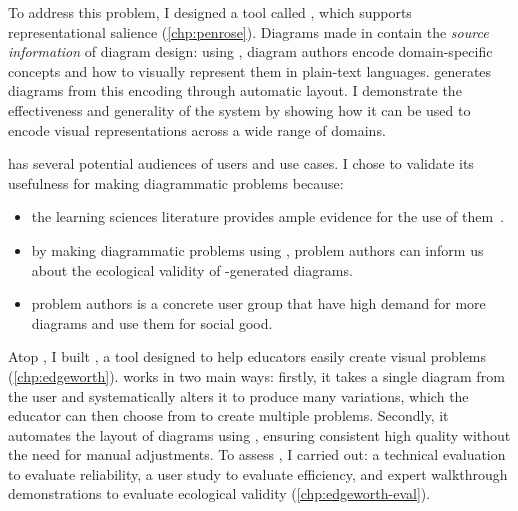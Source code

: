 To address this problem, I designed a tool called \Penrose, which supports representational salience (\cref{chp:penrose}). Diagrams made in \Penrose contain the \emph{source information} of diagram design: using \Penrose, diagram authors encode domain-specific concepts and how to visually represent them in plain-text languages. \Penrose generates diagrams from this encoding through automatic layout. I demonstrate the effectiveness and generality of the system by showing how it can be used to encode visual representations across a wide range of domains.

\Penrose has several potential audiences of users and use cases. I chose to validate its usefulness for making diagrammatic problems because:

\begin{itemize}
    \item the learning sciences literature provides ample evidence for the use of them~\cite{multipleReps, mayer_multimedia_2002, blum_combining_1998}.
    \item by making diagrammatic problems using \Penrose, problem authors can inform us about the ecological validity of \Penrose-generated diagrams.
    \item problem authors is a concrete user group that have high demand for more diagrams and use them for social good.
\end{itemize}

Atop \Penrose, I built \Edgeworth, a tool designed to help educators easily create visual problems (\cref{chp:edgeworth}). \Edgeworth works in two main ways: firstly, it takes a single diagram from the user and systematically alters it to produce many variations, which the educator can then choose from to create multiple problems. Secondly, it automates the layout of diagrams using \Penrose, ensuring consistent high quality without the need for manual adjustments. To assess \Edgeworth, I carried out: a technical evaluation to evaluate reliability, a user study to evaluate efficiency, and expert walkthrough demonstrations to evaluate ecological validity (\cref{chp:edgeworth-eval}). 



